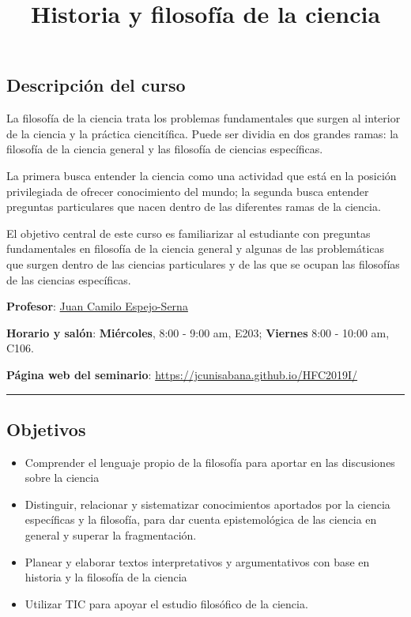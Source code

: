 \documentclass[spanish,]{article}
\title{Historia y filosofía de la ciencia}
\author{}
\date{}
\begin{document}
\maketitle

\subsection{Descripción del curso}\label{descripcion-del-curso}

La filosofía de la ciencia trata los problemas fundamentales que surgen
al interior de la ciencia y la práctica ciencitífica. Puede ser dividia
en dos grandes ramas: la filosofía de la ciencia general y las filosofía
de ciencias específicas.

La primera busca entender la ciencia como una actividad que está en la
posición privilegiada de ofrecer conocimiento del mundo; la segunda
busca entender preguntas particulares que nacen dentro de las diferentes
ramas de la ciencia.

El objetivo central de este curso es familiarizar al estudiante con
preguntas fundamentales en filosofía de la ciencia general y algunas de
las problemáticas que surgen dentro de las ciencias particulares y de
las que se ocupan las filosofías de las ciencias específicas.

\textbf{Profesor}: \href{../index.html}{Juan Camilo Espejo-Serna}~

\textbf{Horario y salón}: \textbf{Miércoles}, 8:00 - 9:00 am, E203; \textbf{Viernes} 8:00
- 10:00 am, C106.

\textbf{Página web del seminario}:
\url{https://jcunisabana.github.io/HFC2019I/}

\begin{center}\rule{0.5\linewidth}{\linethickness}\end{center}

\subsection{Objetivos}\label{objetivos}

\begin{itemize}
\item
  Comprender el lenguaje propio de la filosofía para aportar en las
  discusiones sobre la ciencia
\item
  Distinguir, relacionar y sistematizar conocimientos aportados por la
  ciencia específicas y la filosofía, para dar cuenta epistemológica de
  las ciencia en general y superar la fragmentación.
\item
  Planear y elaborar textos interpretativos y argumentativos con base en
  historia y la filosofía de la ciencia
\item
  Utilizar TIC para apoyar el estudio filosófico de la ciencia.
\end{itemize}
\end{document}

